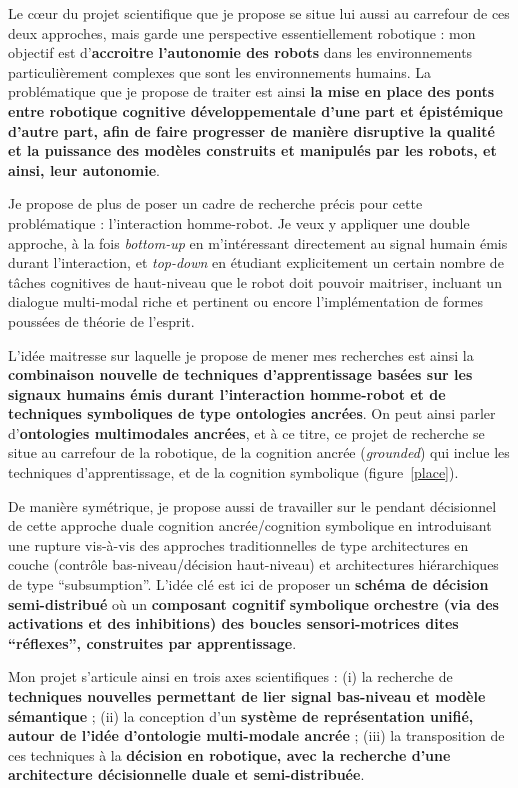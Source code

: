 \documentclass[a4paper]{article}
\begin{document}
Le c\oe ur du projet scientifique que je propose se situe lui aussi au carrefour
de ces deux approches, mais garde une perspective essentiellement robotique :
mon objectif est d'\textbf{accroitre l'autonomie des robots} dans les
environnements particulièrement complexes que sont les environnements humains.
La problématique que je propose de traiter est ainsi \textbf{la mise en
place des ponts entre robotique cognitive développementale d'une part et
épistémique d'autre part, afin de faire progresser de manière disruptive la
qualité et la puissance des modèles construits et manipulés par les robots, et
ainsi, leur autonomie}.

Je propose de plus de poser un cadre de recherche précis pour cette
problématique : l'interaction homme-robot. Je veux y appliquer une double
approche, à la fois \emph{bottom-up} en m'intéressant directement au
signal humain émis durant l'interaction, et \emph{top-down} en étudiant
explicitement un certain nombre de tâches cognitives de haut-niveau que le robot
doit pouvoir maitriser, incluant un dialogue multi-modal riche et pertinent ou
encore l'implémentation de formes poussées de théorie de l'esprit.

L'idée maitresse sur laquelle je propose de mener mes recherches est ainsi la
\textbf{combinaison nouvelle de techniques d'apprentissage basées sur les
signaux humains émis durant l'interaction homme-robot et de techniques
symboliques de type ontologies ancrées}. On peut ainsi parler
d'\textbf{ontologies multimodales ancrées}, et à ce titre, ce projet de
recherche se situe au carrefour de la robotique, de la cognition ancrée
(\emph{grounded}) qui inclue les techniques d'apprentissage, et de la cognition
symbolique (figure~\ref{place}).

De manière symétrique, je propose aussi de travailler sur le pendant décisionnel
de cette approche duale cognition ancrée/cognition symbolique en introduisant
une rupture vis-à-vis des approches traditionnelles de type architectures en
couche (contrôle bas-niveau/décision haut-niveau) et architectures
hiérarchiques de type ``subsumption''. L'idée clé est ici de proposer un
\textbf{schéma de décision semi-distribué} où un \textbf{composant cognitif
symbolique orchestre (via des activations et des inhibitions) des boucles
sensori-motrices dites ``réflexes'', construites par apprentissage}.

Mon projet s'articule ainsi en trois axes scientifiques : (i) la recherche de
\textbf{techniques nouvelles permettant de lier signal bas-niveau et modèle
sémantique} ; (ii) la conception d'un \textbf{système de représentation unifié,
autour de l'idée d'ontologie multi-modale ancrée} ; (iii) la transposition de ces
techniques à la \textbf{décision en robotique, avec la recherche d'une
architecture décisionnelle duale et semi-distribuée}.
\end{document}
